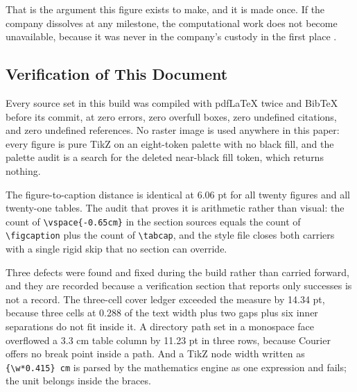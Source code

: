 That is the argument this figure exists to make, and it is made once. If the
company dissolves at any milestone, the computational work does not become
unavailable, because it was never in the company's custody in the first place
\cite{repo2026}.

\subsection{Verification of This Document}

Every source set in this build was compiled with pdfLaTeX twice and BibTeX
before its commit, at zero errors, zero overfull boxes, zero undefined
citations, and zero undefined references. No raster image is used anywhere in
this paper: every figure is pure TikZ on an eight-token palette with no black
fill, and the palette audit is a search for the deleted near-black fill token,
which returns nothing.

The figure-to-caption distance is identical at 6.06 pt for all twenty figures
and all twenty-one tables. The audit that proves it is arithmetic rather than
visual: the count of \texttt{\textbackslash vspace\{-0.65cm\}} in the section
sources equals the count of \texttt{\textbackslash figcaption} plus the count of
\texttt{\textbackslash tabcap}, and the style file closes both carriers with a
single rigid skip that no section can override.

Three defects were found and fixed during the build rather than carried forward,
and they are recorded because a verification section that reports only successes
is not a record. The three-cell cover ledger exceeded the measure by 14.34 pt,
because three cells at 0.288 of the text width plus two gaps plus six inner
separations do not fit inside it. A directory path set in a monospace face
overflowed a 3.3 cm table column by 11.23 pt in three rows, because Courier
offers no break point inside a path. And a TikZ node width written as
\texttt{\{\textbackslash w*0.415\} cm} is parsed by the mathematics engine as
one expression and fails; the unit belongs inside the braces.
